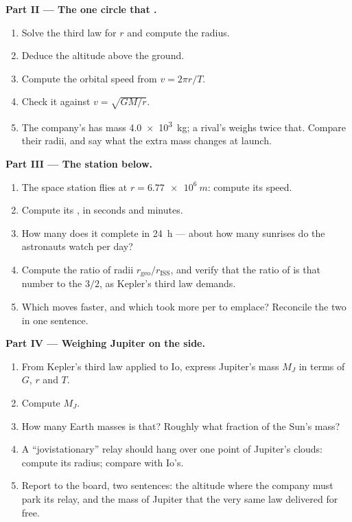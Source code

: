 \begin{problem}
\medskip
\noindent\textbf{Part II --- The one circle that .}
\begin{enumerate}[resume]
  \item Solve the third law for $r$ and compute the 
        radius.
  \item Deduce the altitude above the ground.
  \item Compute the orbital speed from $v = 2\pi r/T$.
  \item Check it against $v = \sqrt{GM/r}$.
  \item The company's  has mass \qty{4.0e3}{kg}; a rival's
        weighs twice that. Compare their  radii, and
        say what the extra mass changes at launch.
\end{enumerate}

\medskip
\noindent\textbf{Part III --- The station below.}
\begin{enumerate}[resume]
  \item The space station flies at $r = \qty{6.77e6}{m}$: compute
        its speed.
  \item Compute its , in seconds and minutes.
  \item How many  does it complete in \qty{24}{h} --- about
        how many sunrises do the astronauts watch per day?
  \item Compute the ratio of radii $r_{\text{geo}}/r_{\text{ISS}}$,
        and verify that the ratio of  is that number to the
         $3/2$, as Kepler's third law demands.
  \item Which  moves faster, and which took more  per
         to emplace? Reconcile the two in one sentence.
\end{enumerate}

\medskip
\noindent\textbf{Part IV --- Weighing Jupiter on the side.}
\begin{enumerate}[resume]
  \item From Kepler's third law applied to Io, express Jupiter's
        mass $M_J$ in terms of $G$, $r$ and $T$.
  \item Compute $M_J$.
  \item How many Earth masses is that? Roughly what fraction of the
        Sun's mass?
  \item A ``jovistationary'' relay should hang over one point of
        Jupiter's clouds: compute its  radius; compare with
        Io's.
  \item Report to the board, two sentences: the altitude where the
        company must park its relay, and the mass of Jupiter that
        the very same law delivered for free.
\end{enumerate}
\end{problem}
